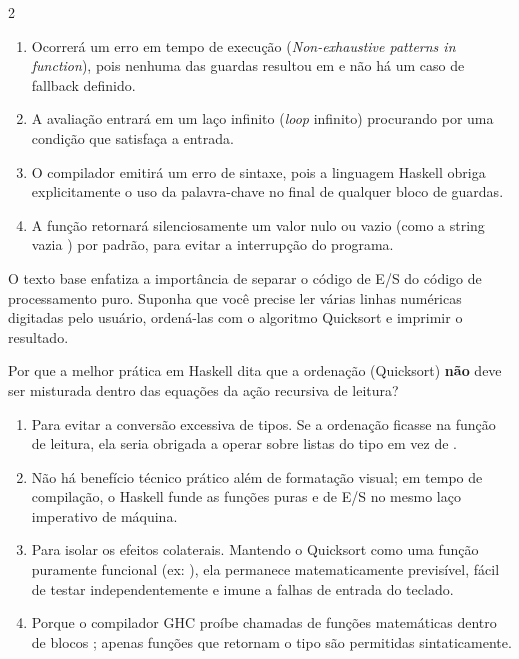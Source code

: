 \documentclass[a4paper,10pt,brazil]{article}
\begin{document}
\begin{multicols}{2}
\begin{enumerate}
  \item Ocorrerá um erro em tempo de execução (\emph{Non-exhaustive patterns in function}), pois nenhuma das guardas resultou em  e não há um caso de fallback definido.

  \item A avaliação entrará em um laço infinito (\emph{loop} infinito) procurando por uma condição que satisfaça a entrada.

  \item O compilador emitirá um erro de sintaxe, pois a linguagem Haskell obriga explicitamente o uso da palavra-chave  no final de qualquer bloco de guardas.

  \item A função retornará silenciosamente um valor nulo ou vazio (como a string vazia ) por padrão, para evitar a interrupção do programa.


\end{enumerate}

O texto base enfatiza a importância de separar o código de E/S do código de processamento puro. Suponha que você precise ler várias linhas numéricas digitadas pelo usuário, ordená-las com o algoritmo Quicksort e imprimir o resultado. 

Por que a melhor prática em Haskell dita que a ordenação (Quicksort) \textbf{não} deve ser misturada dentro das equações da ação recursiva de leitura?

\begin{enumerate}
  \item Para evitar a conversão excessiva de tipos. Se a ordenação ficasse na função de leitura, ela seria obrigada a operar sobre listas do tipo \haskellinline{[IO Int]} em vez de \haskellinline{[Int]}.

  \item Não há benefício técnico prático além de formatação visual; em tempo de compilação, o Haskell funde as funções puras e de E/S no mesmo laço imperativo de máquina.

  \item Para isolar os efeitos colaterais. Mantendo o Quicksort como uma função puramente funcional (ex: \haskellinline{[Int] -> [Int]}), ela permanece matematicamente previsível, fácil de testar independentemente e imune a falhas de entrada do teclado.

  \item Porque o compilador GHC proíbe chamadas de funções matemáticas dentro de blocos ; apenas funções que retornam o tipo  são permitidas sintaticamente.


\end{enumerate}
\end{multicols}
\end{document}
